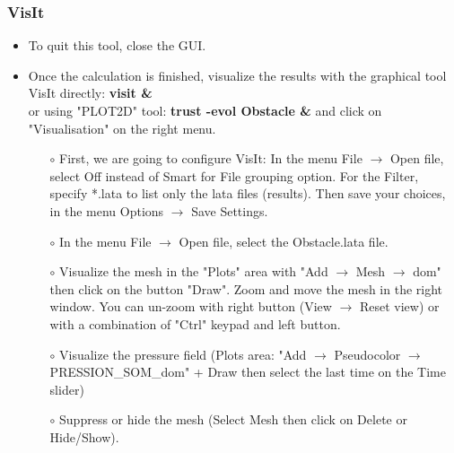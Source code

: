 \documentclass[10pt, hyperref={unicode=true,pdfusetitle, bookmarks=true,bookmarksnumbered=false,bookmarksopen=false, breaklinks=false,pdfborder={0 0 1},backref=true,colorlinks=true,linkcolor=darkblue,pageanchor}]{beamer}
\begin{document}
\begin{frame}
\frametitle{VisIt}
\begin{block}{}

\begin{itemize}
\item To quit this tool, close the GUI.

\item Once the calculation is finished, visualize the results with the graphical tool VisIt directly: \textbf{visit \&} \\
or using "PLOT2D" tool: \textbf{trust -evol Obstacle \&} and click on "Visualisation" on the right menu.

    \begin{itemize}
    \item [$\circ$] First, we are going to configure VisIt: {\footnotesize{In the menu File $\rightarrow$ Open file, select Off instead of Smart for File grouping option. For the Filter, specify *.lata to list only the lata files (results). Then save your choices, in the menu Options $\rightarrow$ Save Settings.}}

    \item [$\circ$] In the menu File $\rightarrow$ Open file, select the Obstacle.lata file.

    \item [$\circ$] Visualize the mesh in the "Plots" area with "Add $\rightarrow$ Mesh $\rightarrow$ dom" then click on the button "Draw". Zoom and move the mesh in the right window. You can un-zoom with right button (View $\rightarrow$ Reset view) or with a combination of "Ctrl" keypad and left button.

    \item [$\circ$] Visualize the pressure field ({\footnotesize{Plots area: "Add $\rightarrow$ Pseudocolor $\rightarrow$ PRESSION\_SOM\_dom" + Draw then select the last time on the Time slider}})
    \item [$\circ$] Suppress or hide the mesh (Select Mesh then click on Delete or Hide/Show).
    \end{itemize}
\end{itemize}

\end{block}
\end{frame}
\end{document}
